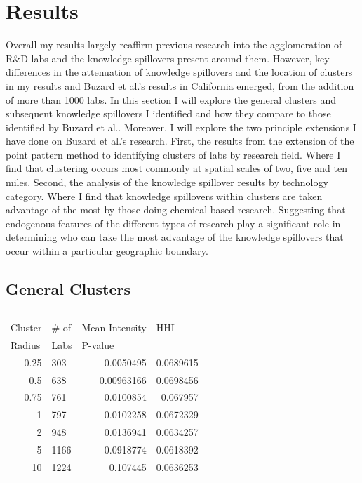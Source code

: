 \documentclass[12pt,letterpaper]{article}
\begin{document}
\section{Results}
Overall my results largely reaffirm previous research into the agglomeration of R\&D labs and the knowledge spillovers present around them. However, key differences in the attenuation of knowledge spillovers and the location of clusters in my results and Buzard et al.'s results in California emerged, from the addition of more than 1000 labs. 
In this section I will explore the general clusters and subsequent knowledge spillovers I identified and how they compare to those identified by Buzard et al.. Moreover, I will explore the two principle extensions I have done on Buzard et al.'s research. First, the results from the extension of the point pattern method to identifying clusters of labs by research field. Where I find that clustering occurs most commonly at spatial scales of two, five and ten miles. Second, the analysis of the knowledge spillover results by technology category. Where I find that knowledge spillovers within clusters are taken advantage of the most by those doing chemical based research. Suggesting that endogenous features of the different types of research play a significant role in determining who can take the most advantage of the knowledge spillovers that occur within a particular geographic boundary.  
\subsection{General Clusters}
\begin{table}[H]
\centering
\begin{tabular}{rlrr}
\hline
\multicolumn{1}{l}{Cluster} & \# of & \multicolumn{1}{l}{Mean Intensity} & \multicolumn{1}{l}{HHI} \\
\multicolumn{1}{l}{Radius}  & Labs  & \multicolumn{1}{l}{P-value}        & \multicolumn{1}{l}{}    \\ \hline
0.25 & 303  & 0.0050495  & 0.0689615 \\
0.5  & 638  & 0.00963166 & 0.0698456 \\
0.75 & 761  & 0.0100854  & 0.067957  \\
1    & 797  & 0.0102258  & 0.0672329 \\
2    & 948  & 0.0136941  & 0.0634257 \\
5    & 1166 & 0.0918774  & 0.0618392 \\
10   & 1224 & 0.107445   & 0.0636253 \\ \hline
\end{tabular}
\caption{}
\label{tab:tab1}
\end{table}
\end{document}
